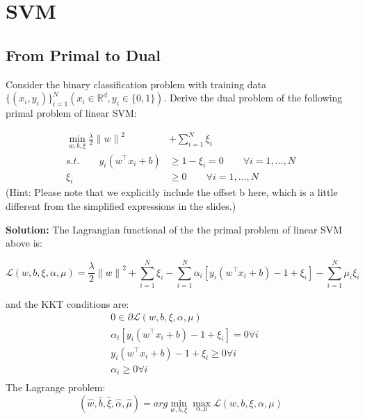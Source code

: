 \documentclass[a4paper]{article}
\begin{document}
\section{SVM}


\subsection{From Primal to Dual}

Consider the binary classification problem with training data $\{(x_i , y_i )\}^{N}_{i=1} (x_i \in \mathbb{R}^d , y_i \in \{0, 1\})$. Derive the dual problem of the following primal problem of linear SVM:

\begin{equation}
    \begin{aligned}
        \min_{w, b, \xi}    \frac{\lambda}{2}{\|w\|}^2 &+ \sum_{i=1}^{N} \xi_i \\
        s.t.\qquad  y_i(w^{\top} x_i + b) &\ge 1- \xi_i =0 \qquad \forall i =1,...,N\\
        \xi_i &\ge 0 \qquad \forall i =1,...,N
    \end{aligned}
\end{equation}
(Hint: Please note that we explicitly include the offset b here, which is a little
different from the simplified expressions in the slides.)

\textbf{Solution:} The Lagrangian functional of the the primal problem  of linear SVM above is:

\begin{equation}
   \mathcal{L}(w,b,\xi,\alpha, \mu) =  \frac{\lambda}{2}{\|w\|}^2 + \sum_{i=1}^{N} \xi_i - \sum_{i=1}^{N} \alpha_i [y_i(w^{\top} x_i + b) - 1+\xi_i] - \sum_{i=1}^{N} \mu_i \xi_i 
\end{equation}

and the KKT conditions are:
\begin{equation}
    \begin{aligned}
        & 0 \in \partial \mathcal{L}(w,b,\xi,\alpha,\mu) \\
        &\alpha_i [y_i(w^{\top} x_i + b) - 1+\xi_i] =0 \forall i \\
        & y_i(w^{\top} x_i + b) - 1+\xi_i \ge 0 \forall i\\
        & \alpha_i \ge 0 \forall i\\
    \end{aligned}
\end{equation}
The Lagrange problem:
\begin{equation}
   (\hat{w}, \hat{b},\hat{\xi},\hat{\alpha},\hat{\mu}) = arg \min_{w,b,\xi} \max_{\alpha,\mu}\mathcal{L}(w,b,\xi,\alpha,\mu) 
\end{equation}
\end{document}
